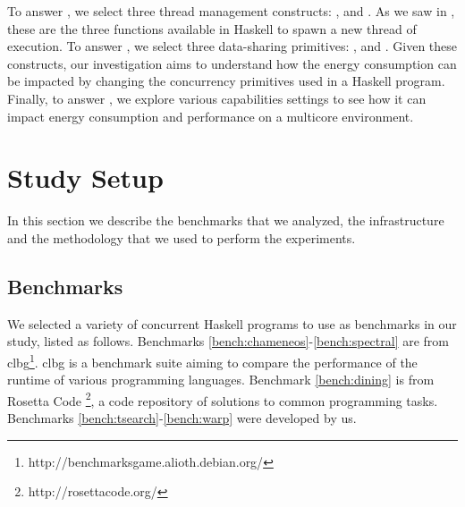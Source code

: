 To answer , we select three thread management constructs: \forkIO, \forkOn and \forkOS. As we saw in , these are the three functions available in Haskell to spawn a new thread of execution. To answer , we select three data-sharing primitives: \MVar, \TMVar and \TVar. Given these constructs, our investigation aims to understand how the energy consumption can be impacted by changing the concurrency primitives used in a Haskell program. Finally, to answer , we explore various capabilities settings to see how it can impact energy consumption and performance on a multicore environment.


\section{Study Setup}\label{sec:setup}
In this section we describe the benchmarks that we analyzed, the infrastructure and the methodology that we used to perform the experiments.

\subsection{Benchmarks}
We selected a variety of concurrent Haskell programs to use as benchmarks in our study, listed as follows. Benchmarks \ref{bench:chameneos}-\ref{bench:spectral} are from \ac{clbg}\footnote{http://benchmarksgame.alioth.debian.org/}. \acs{clbg} is a benchmark suite aiming to compare the performance of the runtime of various programming languages. Benchmark \ref{bench:dining} is from  Rosetta Code \footnote{http://rosettacode.org/}, a code repository of solutions to common programming tasks. Benchmarks \ref{bench:tsearch}-\ref{bench:warp} were developed by us.

